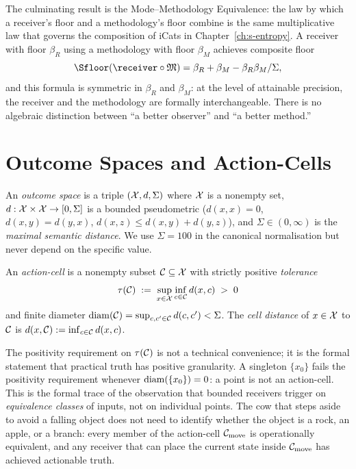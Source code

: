 The culminating result is the Mode--Methodology Equivalence: the law by which a receiver's floor and a methodology's floor combine is the same multiplicative law that governs the composition of iCats in Chapter~\ref{ch:s-entropy}. A receiver with floor $\beta_R$ using a methodology with floor $\beta_M$ achieves composite floor
\[
\Sfloor(\receiver \circ \Meth) = \beta_R + \beta_M - \beta_R \beta_M / \Sigma,
\]
and this formula is symmetric in $\beta_R$ and $\beta_M$: at the level of attainable precision, the receiver and the methodology are formally interchangeable. There is no algebraic distinction between ``a better observer'' and ``a better method.''


\section{Outcome Spaces and Action-Cells}
\label{sec:outcome-cells}

\begin{definition}\label{def:outcome-space}
An \emph{outcome space} is a triple $(\mathcal{X}, d, \Sigma)$ where $\mathcal{X}$ is a nonempty set, $d : \mathcal{X} \times \mathcal{X} \to [0, \Sigma]$ is a bounded pseudometric ($d(x,x)=0$, $d(x,y) = d(y,x)$, $d(x,z) \leq d(x,y) + d(y,z)$), and $\Sigma \in (0,\infty)$ is the \emph{maximal semantic distance}. We use $\Sigma = 100$ in the canonical normalisation but never depend on the specific value.
\end{definition}

\begin{definition}\label{def:action-cell}
An \emph{action-cell} is a nonempty subset $\mathcal{C} \subseteq \mathcal{X}$ with strictly positive \emph{tolerance}
\[
\tau(\mathcal{C}) \;:=\; \sup_{x \in \mathcal{X}} \inf_{c \in \mathcal{C}} d(x,c) \;>\; 0
\]
and finite diameter $\mathrm{diam}(\mathcal{C}) = \sup_{c,c' \in \mathcal{C}} d(c,c') < \Sigma$. The \emph{cell distance} of $x \in \mathcal{X}$ to $\mathcal{C}$ is $d(x, \mathcal{C}) := \inf_{c \in \mathcal{C}} d(x,c)$.
\end{definition}

The positivity requirement on $\tau(\mathcal{C})$ is not a technical convenience; it is the formal statement that practical truth has positive granularity. A singleton $\{x_0\}$ fails the positivity requirement whenever $\mathrm{diam}(\{x_0\}) = 0$: a point is not an action-cell. This is the formal trace of the observation that bounded receivers trigger on \emph{equivalence classes} of inputs, not on individual points. The cow that steps aside to avoid a falling object does not need to identify whether the object is a rock, an apple, or a branch: every member of the action-cell $\mathcal{C}_{\text{move}}$ is operationally equivalent, and any receiver that can place the current state inside $\mathcal{C}_{\text{move}}$ has achieved actionable truth.

